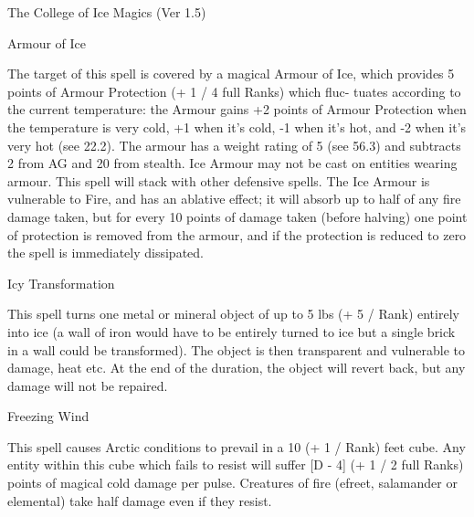 \begin{Chapter}{The College of Ice Magics (Ver 1.5)}
\begin{spell}[S-1]{Armour of Ice}
\begin{effects}
The target of this spell is covered by a magical Armour of Ice, which
provides 5 points of Armour Protection (+ 1 / 4 full Ranks) which
fluc- tuates according to the current temperature: the Armour gains +2
points of Armour Protection when the temperature is very cold, +1 when
it’s cold, -1 when it’s hot, and -2 when it’s very hot (see 22.2). The
armour has a weight rating of 5 (see 56.3) and subtracts 2 from AG and
20 from stealth.  Ice Armour may not be cast on entities wearing
armour.  This spell will stack with other defensive spells.  The Ice
Armour is vulnerable to Fire, and has an ablative effect; it will
absorb up to half of any fire damage taken, but for every 10 points of
damage taken (before halving) one point of protection is removed from
the armour, and if the protection is reduced to zero the spell is
immediately dissipated.
\end{effects}
\end{spell}

\begin{spell}[S-2]{Icy Transformation}
\begin{effects}
This spell turns one metal or mineral object of up to 5 lbs (+ 5 /
Rank) entirely into ice (a wall of iron would have to be entirely
turned to ice but a single brick in a wall could be transformed).  The
object is then transparent and vulnerable to damage, heat etc.  At the
end of the duration, the object will revert back, but any damage will
not be repaired.
\end{effects}
\end{spell}

\begin{spell}[S-3]{Freezing Wind}
\begin{effects}
This spell causes Arctic conditions to prevail in a 10 (+ 1 / Rank)
feet cube.  Any entity within this cube which fails to resist will
suffer [D - 4] (+ 1 / 2 full Ranks) points of magical cold damage per
pulse.  Creatures of fire (efreet, salamander or elemental) take half
damage even if they resist.
\end{effects}
\end{spell}


\end{Chapter}
